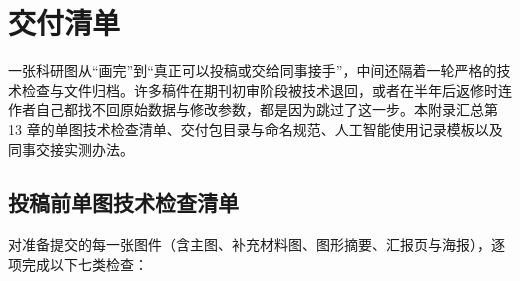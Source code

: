 \chapter{交付清单}
\label{app:delivery-checklist}

一张科研图从“画完”到“真正可以投稿或交给同事接手”，中间还隔着一轮严格的技术检查与文件归档。许多稿件在期刊初审阶段被技术退回，或者在半年后返修时连作者自己都找不回原始数据与修改参数，都是因为跳过了这一步。本附录汇总第 13 章的单图技术检查清单、交付包目录与命名规范、人工智能使用记录模板以及同事交接实测办法。

\section{投稿前单图技术检查清单}

对准备提交的每一张图件（含主图、补充材料图、图形摘要、汇报页与海报），逐项完成以下七类检查：

